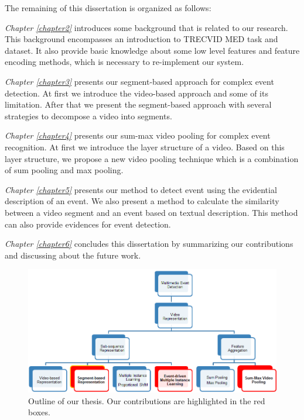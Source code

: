 
The remaining of this dissertation is organized as follows:

\textit{Chapter \ref{chapter2}} introduces some background that is related to our research. This background encompasses an introduction to TRECVID MED task and dataset. It also provide basic knowledge about some low level features and feature encoding methods, which is necessary to re-implement our system. 

\textit{Chapter \ref{chapter3}} presents our segment-based approach for complex event detection. At first we introduce the video-based approach and some of its limitation. After that we present the segment-based approach with several strategies to decompose a video into segments.

\textit{Chapter \ref{chapter4}} presents our sum-max video pooling for complex event recognition. At first we introduce the layer structure of a video. Based on this layer structure, we propose a new video pooling technique which is a combination of sum pooling and max pooling.

\textit{Chapter \ref{chapter5}} presents our method to detect event using the evidential description of an event. We also present a method to calculate the similarity between a video segment and an event based on textual description. This method can also provide evidences for event detection.

\textit{Chapter \ref{chapter6}} concludes this dissertation by summarizing our contributions and discussing about the future work.

	\begin{figure}
		\centering
		\includegraphics[width=1\textwidth]{outline.png}
		\caption{Outline of our thesis. Our contributions are highlighted in the red boxes.}
		\label{c1_outline}
	\end{figure}
	

